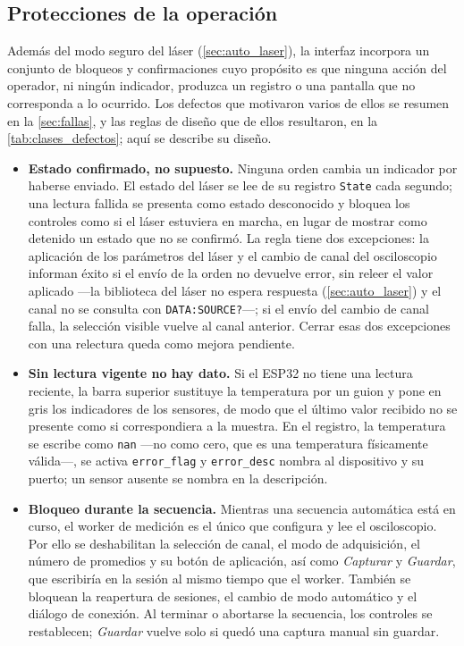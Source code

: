 \subsection{Protecciones de la operación}
\label{sec:protecciones}

Además del modo seguro del láser (\cref{sec:auto_laser}), la interfaz
incorpora un conjunto de bloqueos y confirmaciones cuyo propósito es
que ninguna acción del operador, ni ningún indicador, produzca un
registro o una pantalla que no corresponda a lo ocurrido. Los defectos
que motivaron varios de ellos se resumen en la \cref{sec:fallas}, y las
reglas de diseño que de ellos resultaron, en la
\cref{tab:clases_defectos}; aquí se describe su diseño.

\begin{itemize}
  \item \textbf{Estado confirmado, no supuesto.} Ninguna orden cambia
    un indicador por haberse enviado. El estado del láser se lee de su
    registro \texttt{State} cada segundo; una lectura fallida se
    presenta como estado desconocido y bloquea los controles como si
    el láser estuviera en marcha, en lugar de mostrar como detenido un
    estado que no se confirmó. La regla tiene dos excepciones: la
    aplicación de los parámetros del láser y el cambio de canal del
    osciloscopio informan éxito si el envío de la orden no devuelve
    error, sin releer el valor aplicado ---la biblioteca del láser no
    espera respuesta (\cref{sec:auto_laser}) y el canal no se consulta
    con \texttt{DATA:SOURCE?}---; si el envío del cambio de canal falla,
    la selección visible vuelve al canal anterior. Cerrar esas dos
    excepciones con una relectura queda como mejora pendiente.

  \item \textbf{Sin lectura vigente no hay dato.} Si el ESP32 no tiene
    una lectura reciente, la barra superior sustituye la temperatura
    por un guion y pone en gris los indicadores de los sensores, de
    modo que el último valor recibido no se presente como si
    correspondiera a la muestra. En el registro, la temperatura se
    escribe como \texttt{nan} ---no como cero, que es una temperatura
    físicamente válida---, se activa \texttt{error\_flag} y
    \texttt{error\_desc} nombra al dispositivo y su puerto; un sensor
    ausente se nombra en la descripción.

  \item \textbf{Bloqueo durante la secuencia.} Mientras una secuencia
    automática está en curso, el worker de medición es el único que
    configura y lee el osciloscopio. Por ello se deshabilitan la
    selección de canal, el modo de adquisición, el número de promedios
    y su botón de aplicación, así como \textit{Capturar} y
    \textit{Guardar}, que escribiría en la sesión al mismo tiempo que
    el worker. También se bloquean la reapertura de sesiones, el
    cambio de modo automático y el diálogo de conexión. Al terminar o
    abortarse la secuencia, los controles se restablecen;
    \textit{Guardar} vuelve solo si quedó una captura manual sin
    guardar.


\end{itemize}
